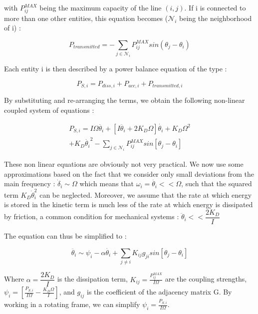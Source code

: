 \documentclass[10pt,twoside%
                ,draft%
        ]{article}
\begin{document}
with $ P_{ij}^{MAX} $ being the maximum capacity of the line $(i,j)$. If i is connected to more than one other entities, this equation becomes ($\mathcal{N}_i$ being the neighborhood of  i) : 

\begin{equation}
  P_{transmitted} = - \sum_{j \in \mathcal{N}_i} P_{ij}^{MAX} sin( \theta_j - \theta_i ) 
\end{equation}


Each entity i is then described by a power balance equation of the type :

\begin{equation}
 P_{S,i}  =  P_{diss,i} + P_{acc,i} + P_{transmitted,i} 
\end{equation}

By substituting and re-arranging the terms, we obtain the following non-linear coupled system of equations :

\begin{equation}
\begin{array}{lll}
P_{S, i}  =  I \Omega \ddot{ \theta_i }  + \left[ I \ddot{ \theta_i } + 2 K_D \Omega \right] \dot{ \theta_i } + K_D \Omega^2 \\+ K_D \dot{ \theta_i }^2 - \sum_{j \in \mathcal{N}_i} P_{ij}^{MAX} sin \left[ \theta_j - \theta_i \right] \end{array}
\end{equation}

These non linear equations are obviously not very practical. We now use some approximations based on the fact that we consider only small deviations from the main frequency : $ \dot{ \delta}_i \sim \Omega $ which means that $ \omega_i = \dot{\theta_i} << \Omega $, such that the squared term $ K_D \dot{\theta}_i^2 $ can be neglected.
Moreover, we assume that the rate at which energy is stored in the kinetic term is much less of the rate at which energy is dissipated by friction, a common condition for mechanical systems : $ \ddot{ \theta }_i  << \dfrac{2 K_D}{I} $

The equation can thus be simplified to :

\begin{equation}
 \ddot{ \theta_i } \sim \psi_i - \alpha \dot{ \theta_i } + \sum_{j\neq i} K_{ij} g_{ji} sin \left[ \theta_j - \theta_i \right] 
\end{equation}

Where $ \alpha = \dfrac{2 K_D}{I} $ is the dissipation term, $ K_{ij} = \frac{P_{ij}^{MAX}}{I \Omega} $ are the coupling strengths, $ \psi_i = \left[ \frac{P_{S,i}}{I \Omega} - \frac{K_D \Omega}{I} \right] $, and $ g_{ij} $ is the coefficient of the adjacency matrix G.
By working in a rotating frame, we can simplify $ \psi_i=\frac{P_{S,i}}{I \Omega} $.
\end{document}
